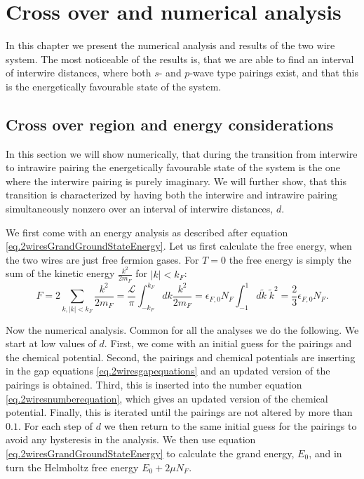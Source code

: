 
\chapter{Cross over and numerical analysis} %

\label{Chapter10} %


In this chapter we present the numerical analysis and results of the two wire system. The most noticeable of the results is, that we are able to find an interval of interwire distances, where both $s$- and $p$-wave type pairings exist, and that this is the energetically favourable state of the system.

\section{Cross over region and energy considerations}
\label{sec.2wiresCrossover_energy}
In this section we will show numerically, that during the transition from interwire to intrawire pairing the energetically favourable state of the system is the one where the interwire pairing is purely imaginary. We will further show, that this transition is characterized by having both the interwire and intrawire pairing simultaneously nonzero over an interval of interwire distances, $d$. 

We first come with an energy analysis as described after equation \eqref{eq.2wiresGrandGroundStateEnergy}. Let us first calculate the free energy, when the two wires are just free fermion gases. For $T = 0$ the free energy is simply the sum of the kinetic energy $\frac{k^2}{2m_F}$ for $|k| < k_F$: 
\begin{equation}
F = 2\sum_{k, |k| < k_F} \frac{k^2}{2m_F} = \frac{\mathcal{L}}{\pi} \int^{k_F}_{-k_F} dk \frac{k^2}{2m_F} = \epsilon_{F,0} N_F \int^{1}_{-1} d\tilde{k}\; \tilde{k}^2 = \frac{2}{3}\epsilon_{F,0} N_F. 
\end{equation}

Now the numerical analysis. Common for all the analyses we do the following. We start at low values of $d$. First, we come with an initial guess for the pairings and the chemical potential. Second, the pairings and chemical potentials are inserting in the gap equations \ref{eq.2wiresgapequations} and an updated version of the pairings is obtained. Third, this is inserted into the number equation \ref{eq.2wiresnumberequation}, which gives an updated version of the chemical potential. Finally, this is iterated until the pairings are not altered by more than $0.1$\textperthousand. For each step of $d$ we then return to the same initial guess for the pairings to avoid any hysteresis in the analysis. We then use equation \eqref{eq.2wiresGrandGroundStateEnergy} to calculate the grand energy, $E_0$, and in turn the Helmholtz free energy $E_0 + 2\mu N_F$.  

